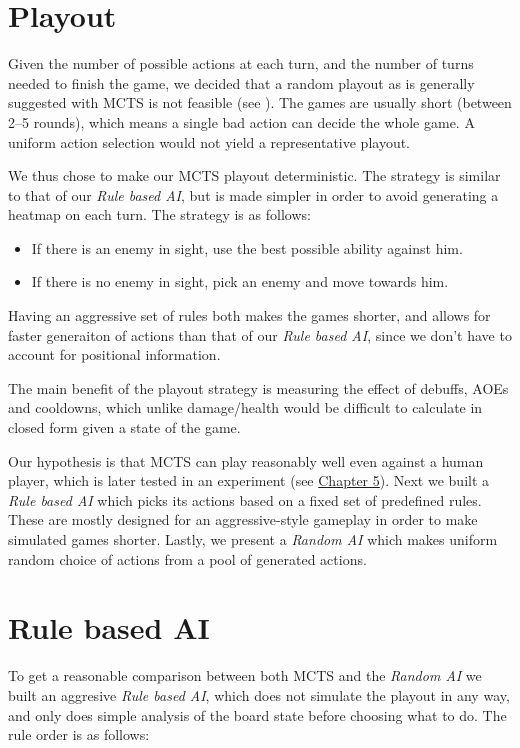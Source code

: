 \section{Playout}

Given the number of possible actions at each turn, and the number of turns
needed to finish the game, we decided that a random playout as is generally
suggested with MCTS is not feasible (see \citet{mcts-survey}). The games
are usually short (between 2--5 rounds), which means a single bad action can decide
the whole game. A uniform action selection would not yield a representative playout.

We thus chose to make our MCTS playout deterministic. The strategy
is similar to that of our \emph{Rule based AI}, but is made simpler in order
to avoid generating a heatmap on each turn. The strategy is as follows:

\begin{itemize}
\item If there is an enemy in sight, use the best possible ability against him.
\item If there is no enemy in sight, pick an enemy and move towards him.
\end{itemize}

Having an aggressive set of rules both makes the games shorter, and allows for faster
generaiton of actions than that of our \emph{Rule based AI}, since we don't have to account
for positional information.

The main benefit of the playout strategy is measuring the effect of debuffs, AOEs and cooldowns,
which unlike damage/health would be difficult to calculate in closed form given a state of the game.

Our hypothesis is that MCTS can play reasonably well even against a human
player, which is later tested in an experiment (see
\hyperref[chapter05]{Chapter 5}).  Next we built a \emph{Rule based AI} which
picks its actions based on a fixed set of predefined rules. These are mostly
designed for an aggressive-style gameplay in order to make simulated games
shorter. Lastly, we present a \emph{Random AI} which makes uniform random
choice of actions from a pool of generated actions.

\section{Rule based AI}

To get a reasonable comparison between both MCTS and the \emph{Random AI} we
built an aggresive \emph{Rule based AI}, which does not simulate the playout in
any way, and only does simple analysis of the board state before choosing what
to do. The rule order is as follows:

